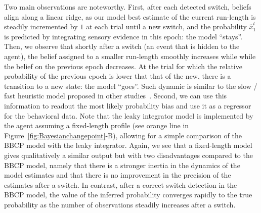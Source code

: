 \documentclass[10pt,letterpaper]{article}
\newcommand{\citep}[1]{\cite{#1}}
\newcommand{\seeFig}[1]{Figure~\ref{fig:#1}}
\begin{document}
Two main observations are noteworthy. First, after each detected switch, beliefs align along a linear ridge,
as our model best estimate of the current run-length is steadily incremented by $1$ at each trial until a new switch,
and the probability $\hat{x}_1^t$ is predicted  by integrating sensory evidence in this epoch: the model  ``stays''.
Then, we observe that shortly after a switch (an event that is hidden to the agent),
the belief assigned to a smaller run-length smoothly increases while
while the belief on the previous epoch decreases.
At the trial for which the relative probability of the previous epoch
is lower that that of the new,
there is a transition to a new state: the model ``goes''.
Such dynamic is similar to the slow / fast heuristic model proposed in other studies~\citep{Schutz14}.
Second, we can use this information to readout the most likely probability bias and
use it as a regressor for the behavioral data.
Note that the leaky integrator model is implemented
by the agent assuming a fixed-length profile (see orange line in \seeFig{Bayesianchangepoint}-B),
allowing for a simple comparison of the BBCP model with the leaky integrator.
Again, we see that a fixed-length model gives qualitatively a similar output
but with two disadvantages compared to the BBCP model, namely that
there is a stronger inertia in the dynamics of the model estimates and
that there is no improvement in the precision of the estimates after a switch.
In contrast, after a correct switch detection in the BBCP model,
the value of the inferred probability converges rapidly to the true probability
as the number of observations steadily increases after a switch.
\end{document}
